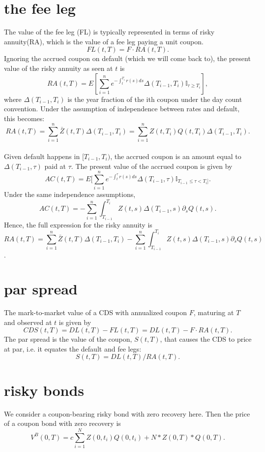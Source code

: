 \documentclass[a4paper,twoside,10pt]{report}
\begin{document}
\section{the fee leg}
The value of the fee leg (FL) is typically represented in terms of risky annuity(RA), which is the value of a fee leg paying a unit coupon. \[ FL(t,T) = F \cdot RA(t,T).\]
Ignoring the accrued coupon on default (which we will come back to), the present value of the risky annuity as seen at $t$ is
\[ RA(t,T) = E[\sum_{i=1}^n e^{-\int_t^{T_i} r(s)ds} \Delta(T_{i-1},T_i) \mathbb{I}_{\tau \geq T_i}],\] where $\Delta(T_{i-1},T_i)$ is the year fraction of the ith coupon under the day count convention. Under the assumption of independence between rates and default, this becomes: \[ RA(t,T) = \sum_{i=1}^n \bar{Z}(t,T) \Delta(T_{i-1},T_i) = \sum_{i=1}^n Z(t,T_i) Q(t,T_i) \Delta(T_{i-1},T_i).\] \\
Given default happens in $[T_{i-1},T_i)$, the accrued coupon is an amount equal to $\Delta(T_{i-1},\tau)$ paid at $\tau$. The present value of the accrued coupon is given by \[ AC(t,T) = E[\sum_{i=1}^n e^{-\int_t^{\tau}r(s)ds} \Delta(T_{i-1},\tau) \mathbb{I}_{T_{i-1} \leq \tau < T_i]}.\] Under the same independence assumptions, \[ AC(t,T) = - \sum_{i=1}^n \int_{T_{i-1}}^{T_i} Z(t,s) \Delta(T_{i-1},s) \partial_s Q(t,s).\] Hence, the full expression for the risky annuity is \[ RA(t,T) = \sum_{i=1}^n \bar{Z}(t,T) \Delta(T_{i-1},T_i) - \sum_{i=1}^n \int_{T_{i-1}}^{T_i} Z(t,s) \Delta(T_{i-1},s) \partial_s Q(t,s)\]. \\

\section{par spread}
The mark-to-market value of a CDS with annualized coupon $F$, maturing at $T$ and observed at $t$ is given by \[ CDS(t,T) = DL(t,T) - FL(t,T) = DL(t,T) - F \cdot RA(t,T).\] The par spread is the value of the coupon, $S(t,T)$, that causes the CDS to price at par, i.e. it equates the default and fee legs: \[ S(t,T) = DL(t,T)/RA(t,T).\]

\section{risky bonds}
We consider a coupon-bearing risky bond with zero recovery here. Then the price of a coupon bond with zero recovery is
\begin{equation}
V^B(0,T) = c \sum_{i=1}^N Z(0,t_i)Q(0,t_i) + N * Z(0,T) * Q(0,T).
\end{equation}
\end{document}
